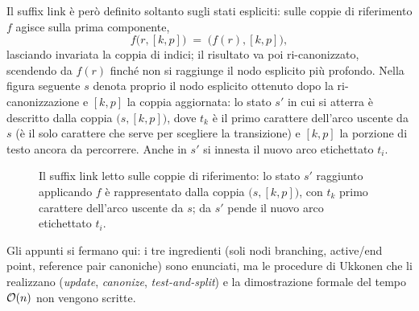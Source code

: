 Il suffix link è però definito soltanto sugli stati espliciti: sulle coppie di riferimento $f$
agisce sulla prima componente,
\[
  f\bigl(r,[k,p]\bigr)\;=\;\bigl(f(r),[k,p]\bigr),
\]
lasciando invariata la coppia di indici; il risultato va poi ri-canonizzato, scendendo da
$f(r)$ finché non si raggiunge il nodo esplicito più profondo. Nella figura seguente $s$
denota proprio il nodo esplicito ottenuto dopo la ri-canonizzazione e $[k,p]$ la coppia
aggiornata: lo stato $s'$ in cui si atterra è descritto dalla coppia $\bigl(s,[k,p]\bigr)$,
dove $t_k$ è il primo carattere dell'arco uscente da $s$ (è il solo carattere che serve per
scegliere la transizione) e $[k,p]$ la porzione di testo ancora da percorrere.
Anche in $s'$ si innesta il nuovo arco etichettato $t_i$.

\begin{figure}[H]
\centering

\caption{Il suffix link letto sulle coppie di riferimento: lo stato $s'$ raggiunto applicando
$f$ è rappresentato dalla coppia $\bigl(s,[k,p]\bigr)$, con $t_k$ primo carattere dell'arco
uscente da $s$; da $s'$ pende il nuovo arco etichettato $t_i$.}
\label{fig:ukkonen-refpair-f}
\end{figure}

\begin{osservazione}
Gli appunti si fermano qui: i tre ingredienti (soli nodi branching, active/end point,
reference pair canoniche) sono enunciati, ma le procedure di Ukkonen che li realizzano
(\emph{update}, \emph{canonize}, \emph{test-and-split}) e la dimostrazione formale del tempo
$\mathcal{O}(n)$ non vengono scritte.
\end{osservazione}

